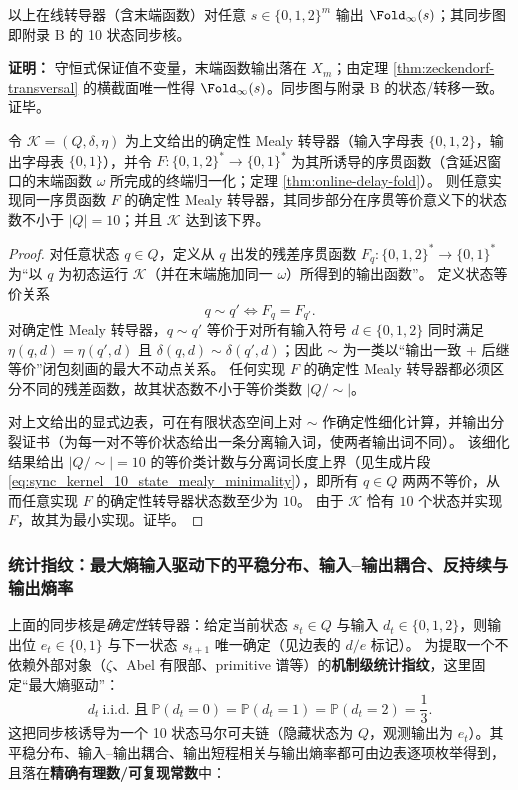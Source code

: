 \begin{theorem}\label{thm:online-delay-fold}
以上在线转导器（含末端函数）对任意 $s\in\{0,1,2\}^m$ 输出 $\Fold_\infty(s)$；其同步图即附录 B 的 10 状态同步核。
\end{theorem}

\textbf{证明：}
守恒式保证值不变量，末端函数输出落在 $X_m$；由定理 \ref{thm:zeckendorf-transversal} 的横截面唯一性得 $\Fold_\infty(s)$。同步图与附录 B 的状态/转移一致。证毕。

\begin{theorem}\label{thm:online-delay-fold-sync-mealy-minimality}
令 \(\mathcal K=(Q,\delta,\eta)\) 为上文给出的确定性 Mealy 转导器（输入字母表 \(\{0,1,2\}\)，输出字母表 \(\{0,1\}\)），并令 \(F:\{0,1,2\}^\ast\to\{0,1\}^\ast\) 为其所诱导的序贯函数（含延迟窗口的末端函数 \(\omega\) 所完成的终端归一化；定理 \ref{thm:online-delay-fold}）。
则任意实现同一序贯函数 \(F\) 的确定性 Mealy 转导器，其同步部分在序贯等价意义下的状态数不小于 \(|Q|=10\)；并且 \(\mathcal K\) 达到该下界。
\end{theorem}
\begin{proof}
对任意状态 \(q\in Q\)，定义从 \(q\) 出发的残差序贯函数 \(F_q:\{0,1,2\}^\ast\to\{0,1\}^\ast\) 为“以 \(q\) 为初态运行 \(\mathcal K\)（并在末端施加同一 \(\omega\)）所得到的输出函数”。
定义状态等价关系
\[
q\sim q'\iff F_q=F_{q'}.
\]
对确定性 Mealy 转导器，\(q\sim q'\) 等价于对所有输入符号 \(d\in\{0,1,2\}\) 同时满足 \(\eta(q,d)=\eta(q',d)\) 且 \(\delta(q,d)\sim \delta(q',d)\)；因此 \(\sim\) 为一类以“输出一致 + 后继等价”闭包刻画的最大不动点关系。
任何实现 \(F\) 的确定性 Mealy 转导器都必须区分不同的残差函数，故其状态数不小于等价类数 \(|Q/{\sim}|\)。
\par
对上文给出的显式边表，可在有限状态空间上对 \(\sim\) 作确定性细化计算，并输出分裂证书（为每一对不等价状态给出一条分离输入词，使两者输出词不同）。
该细化结果给出 \(|Q/{\sim}|=10\) 的等价类计数与分离词长度上界（见生成片段 \eqref{eq:sync_kernel_10_state_mealy_minimality}），即所有 \(q\in Q\) 两两不等价，从而任意实现 \(F\) 的确定性转导器状态数至少为 \(10\)。
由于 \(\mathcal K\) 恰有 \(10\) 个状态并实现 \(F\)，故其为最小实现。证毕。
\end{proof}

\subsubsection{统计指纹：最大熵输入驱动下的平稳分布、输入--输出耦合、反持续与输出熵率}\label{subsec:sync10-stat-fingerprint}
上面的同步核是\emph{确定性}转导器：给定当前状态 $s_t\in Q$ 与输入 $d_t\in\{0,1,2\}$，则输出位 $e_t\in\{0,1\}$ 与下一状态 $s_{t+1}$ 唯一确定（见边表的 $d/e$ 标记）。
为提取一个不依赖外部对象（$\zeta$、Abel 有限部、primitive 谱等）的\textbf{机制级统计指纹}，这里固定“最大熵驱动”：
$$
d_t\ \text{i.i.d. 且}\ \mathbb P(d_t=0)=\mathbb P(d_t=1)=\mathbb P(d_t=2)=\frac{1}{3}.
$$
这把同步核诱导为一个 10 状态马尔可夫链（隐藏状态为 $Q$，观测输出为 $e_t$）。其平稳分布、输入--输出耦合、输出短程相关与输出熵率都可由边表逐项枚举得到，且落在\textbf{精确有理数/可复现常数}中：


